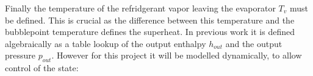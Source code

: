 %
%
%

Finally the temperature of the refridgerant vapor leaving the evaporator $T_v$ must be defined. This is crucial as the difference between this temperature and the bubblepoint temperature defines the superheat. In previous work \cite{Sorensen2013} it is defined algebraically as a table lookup of the output enthalpy $h_{out}$ and the output pressure $p_{out}$. However for this project it will be modelled dynamically, to allow control of the state:\\

